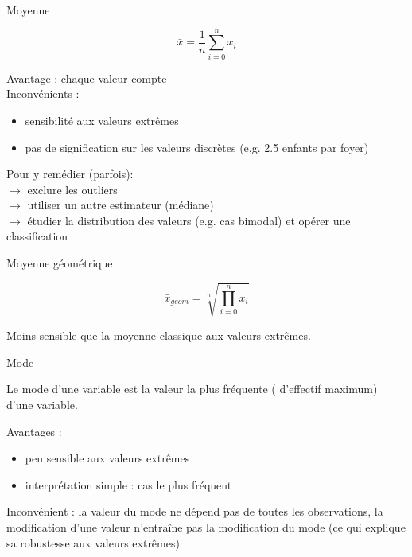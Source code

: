 \documentclass{beamer}
\begin{document}
\begin{frame}{Moyenne}


$$ \bar{x} = \frac{1}{n}\sum_{i=0}^{n} x_i$$


\begin{spacing}{0.9}
\begin{small}
Avantage  : chaque valeur compte  \\
Inconvénients : \\ 
\begin{itemize}
  \item sensibilité aux valeurs extrêmes 
  \item pas de signification sur les valeurs discrètes (e.g. 2.5 enfants par foyer)
\end{itemize}

Pour y remédier (parfois): \\
$\rightarrow$ exclure les outliers\\
$\rightarrow$ utiliser un autre estimateur (médiane)\\
$\rightarrow$ étudier la distribution des valeurs (e.g. cas bimodal) et opérer une classification
\end{small}
\end{spacing}

\end{frame}



\begin{frame}{Moyenne géométrique}

$$ \bar{x}_{geom} = \sqrt[n]{\prod _{i=0}^{n} x_i}$$  


Moins sensible que la moyenne classique aux valeurs extrêmes.

\end{frame}



\begin{frame}{Mode}


Le \alert{mode} d’une variable est la valeur la plus \alert{fréquente} ( d’effectif maximum) d’une variable.
\begin{spacing}{0.9}
\begin{small}
Avantages  : 
\begin{itemize}
  \item peu sensible aux valeurs extrêmes 
  \item interprétation  simple : cas le plus fréquent
\end{itemize}  
Inconvénient :  la valeur du mode ne dépend pas de toutes les observations, la modification d'une valeur n'entraîne pas la modification du mode (ce qui explique sa robustesse aux valeurs extrêmes)

\end{small}
\end{spacing}

\end{frame}
\end{document}
